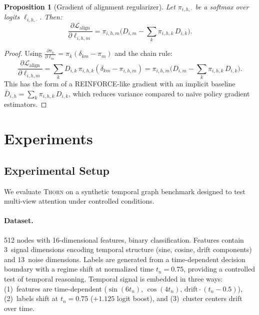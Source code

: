 \documentclass[11pt,a4paper]{article}
\newtheorem{proposition}[theorem]{Proposition}
\newcommand{\thorn}{\textsc{Thorn}}
\newcommand{\calL}{\mathcal{L}}
\begin{document}
\begin{proposition}[Gradient of alignment regularizer]
  \label{prop:reinforce}
  Let $\pi_{i,h,\cdot}$ be a softmax over logits $\ell_{i,h,\cdot}$.
  Then:
  \begin{equation}
    \frac{\partial \calL_{\mathrm{align}}}{\partial \ell_{i,h,m}}
    = \pi_{i,h,m} \Big(
      D_{i,m} - \sum_{k} \pi_{i,h,k}\, D_{i,k}
    \Big).
  \end{equation}
\end{proposition}

\begin{proof}
  Using $\frac{\partial \pi_k}{\partial \ell_m} =
  \pi_k(\delta_{km} - \pi_m)$ and the chain rule:
  \begin{equation}
    \frac{\partial \calL_{\mathrm{align}}}{\partial \ell_{i,h,m}}
    = \sum_k D_{i,k}\, \pi_{i,h,k}(\delta_{km} - \pi_{i,h,m})
    = \pi_{i,h,m}\Big(D_{i,m} - \sum_k \pi_{i,h,k}\, D_{i,k}\Big).
  \end{equation}
  This has the form of a REINFORCE-like gradient with an implicit
  baseline $\bar{D}_{i,h} = \sum_k \pi_{i,h,k}\, D_{i,k}$, which
  reduces variance compared to na\"ive policy gradient estimators.
\end{proof}

\section{Experiments}
\label{sec:experiments}

\subsection{Experimental Setup}
\label{sec:setup}

We evaluate \thorn{} on a synthetic temporal graph benchmark designed
to test multi-view attention under controlled conditions.

\paragraph{Dataset.}
512 nodes with 16-dimensional features, binary classification.
Features contain 3~signal dimensions encoding temporal structure
(sine, cosine, drift components) and 13~noise dimensions.
Labels are generated from a time-dependent decision boundary with a
regime shift at normalized time $t_n = 0.75$, providing a controlled
test of temporal reasoning.
Temporal signal is embedded in three ways:
(1)~features are time-dependent ($\sin(6t_n)$, $\cos(4t_n)$,
$\text{drift} \cdot (t_n - 0.5)$),
(2)~labels shift at $t_n = 0.75$ ($+1.125$ logit boost), and
(3)~cluster centers drift over time.
\end{document}
